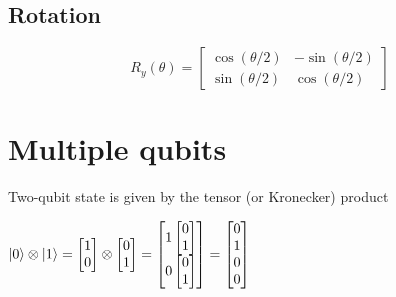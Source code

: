 \documentclass[11pt, fleqn]{article}
\begin{document}
\vspace{1em}
\subsection{Rotation}
\[R_y(\theta) =\begin{bmatrix}\cos(\theta/2) & -\sin(\theta/2)\\ \sin(\theta/2) & \cos(\theta/2)\end{bmatrix}\]

\newpage
\section{Multiple qubits}

Two-qubit state is given by the tensor (or Kronecker) product

$|0\rangle \otimes |1\rangle=
\begin{bmatrix}1\\0 \end{bmatrix}\otimes
\begin{bmatrix}0\\1 \end{bmatrix}=
\begin{bmatrix}1\begin{bmatrix}0\\1 \end{bmatrix}\\0\begin{bmatrix}0\\1 \end{bmatrix}\end{bmatrix}=
\begin{bmatrix}0\\1\\0\\0 \end{bmatrix}
\\~\\$
\end{document}
